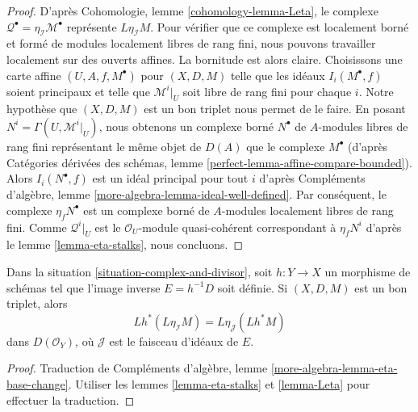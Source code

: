 \begin{proof}
D'après Cohomologie, lemme \ref{cohomology-lemma-Leta},
le complexe $\mathcal{Q}^\bullet = \eta_\mathcal{I}\mathcal{M}^\bullet$
représente $L\eta_\mathcal{I}M$. Pour vérifier que ce complexe
est localement borné et formé de modules localement libres de rang fini, nous pouvons travailler
localement sur des ouverts affines. La bornitude est alors claire.
Choisissons une carte affine $(U, A, f, M^\bullet)$ pour $(X, D, M)$
telle que les idéaux $I_i(M^\bullet, f)$ soient principaux et telle que
$\mathcal{M}^i|_U$ soit libre de rang fini pour chaque $i$. Notre hypothèse
que $(X, D, M)$ est un bon triplet nous permet de le faire. En posant
$N^i = \Gamma(U, \mathcal{M}^i|_U)$, nous obtenons un complexe borné
$N^\bullet$ de $A$-modules libres de rang fini représentant le
même objet de $D(A)$ que le complexe $M^\bullet$ (d'après
Catégories dérivées des schémas, lemme
\ref{perfect-lemma-affine-compare-bounded}).
Alors $I_i(N^\bullet, f)$ est un idéal principal pour tout $i$
d'après Compléments d'algèbre, lemme \ref{more-algebra-lemma-ideal-well-defined}.
Par conséquent, le complexe $\eta_fN^\bullet$ est un complexe borné
de $A$-modules localement libres de rang fini. Comme
$\mathcal{Q}^i|_U$ est le $\mathcal{O}_U$-module quasi-cohérent
correspondant à $\eta_fN^i$ d'après le lemme \ref{lemma-eta-stalks}, nous concluons.
\end{proof}

\begin{lemma}
\label{lemma-complex-and-divisor-eta-pull}
Dans la situation \ref{situation-complex-and-divisor}, soit $h : Y \to X$
un morphisme de schémas tel que l'image inverse $E = h^{-1}D$
soit définie. Si $(X, D, M)$ est un bon triplet, alors
$$
Lh^*(L\eta_\mathcal{I}M) = L\eta_\mathcal{J}(Lh^*M)
$$
dans $D(\mathcal{O}_Y)$, où $\mathcal{J}$ est le faisceau d'idéaux de $E$.
\end{lemma}

\begin{proof}
Traduction de
Compléments d'algèbre, lemme \ref{more-algebra-lemma-eta-base-change}.
Utiliser les lemmes \ref{lemma-eta-stalks} et \ref{lemma-Leta}
pour effectuer la traduction.
\end{proof}

